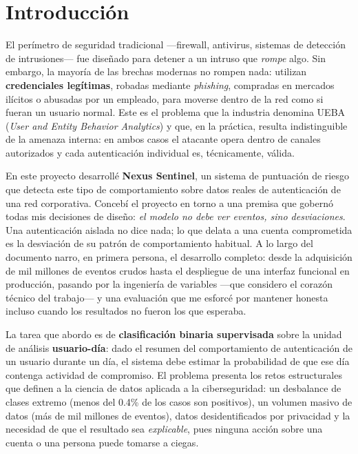 \documentclass[12pt, a4paper]{article}
\begin{document}
\newpage
\tableofcontents
\newpage

\section{Introducción}

El perímetro de seguridad tradicional ---firewall, antivirus, sistemas de detección de
intrusiones--- fue diseñado para detener a un intruso que \textit{rompe} algo. Sin embargo, la
mayoría de las brechas modernas no rompen nada: utilizan \textbf{credenciales legítimas}, robadas
mediante \textit{phishing}, compradas en mercados ilícitos o abusadas por un empleado, para moverse
dentro de la red como si fueran un usuario normal. Este es el problema que la industria denomina
UEBA (\textit{User and Entity Behavior Analytics}) y que, en la práctica, resulta indistinguible de
la amenaza interna: en ambos casos el atacante opera dentro de canales autorizados y cada
autenticación individual es, técnicamente, válida.

En este proyecto desarrollé \textbf{Nexus Sentinel}, un sistema de puntuación de riesgo que detecta
este tipo de comportamiento sobre datos reales de autenticación de una red corporativa. Concebí el
proyecto en torno a una premisa que gobernó todas mis decisiones de diseño: \textit{el modelo no debe
ver eventos, sino desviaciones}. Una autenticación aislada no dice nada; lo que delata a una cuenta
comprometida es la desviación de su patrón de comportamiento habitual. A lo largo del documento
narro, en primera persona, el desarrollo completo: desde la adquisición de mil millones de eventos
crudos hasta el despliegue de una interfaz funcional en producción, pasando por la ingeniería de
variables ---que considero el corazón técnico del trabajo--- y una evaluación que me esforcé por
mantener honesta incluso cuando los resultados no fueron los que esperaba.

La tarea que abordo es de \textbf{clasificación binaria supervisada} sobre la unidad de análisis
\textbf{usuario-día}: dado el resumen del comportamiento de autenticación de un usuario durante un
día, el sistema debe estimar la probabilidad de que ese día contenga actividad de compromiso. El
problema presenta los retos estructurales que definen a la ciencia de datos aplicada a la
ciberseguridad: un desbalance de clases extremo (menos del 0.4\% de los casos son positivos), un
volumen masivo de datos (más de mil millones de eventos), datos desidentificados por privacidad y la
necesidad de que el resultado sea \textit{explicable}, pues ninguna acción sobre una cuenta o una
persona puede tomarse a ciegas.
\end{document}
